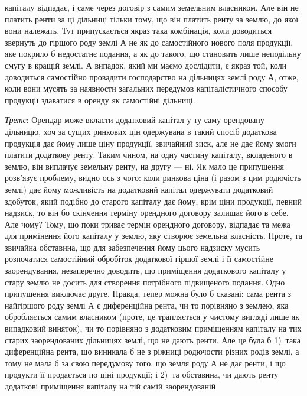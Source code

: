 \parcont{}  %
капіталу відпадає, і саме через договір з самим земельним власником. Але він не платить
ренти за ці дільниці тільки тому, що він платить ренту за землю, до
якої вони належать. Тут припускається якраз така комбінація, коли доводиться
звернуть до гіршого роду землі $А$ не як до самостійного нового поля продукції,
яке покрило б недостатнє подання, а як до такого, що становить лише
неподільну смугу в кращій землі. А випадок, який ми маємо дослідити, є якраз той,
коли доводиться самостійно провадити господарство на дільницях землі роду $А$,
отже, коли вони мусять за наявности загальних передумов капіталістичного способу
продукції здаватися в оренду як самостійні дільниці.

\emph{Третє}: Орендар може вкласти додатковий капітал у ту саму орендовану
дільницю, хоч за сущих ринкових цін одержувана в такий спосіб додаткова
продукція дає йому лише ціну продукції, звичайний зиск, але не дає йому
змоги платити додаткову ренту. Таким чином, на одну частину капіталу, вкладеного
в землю, він виплачує земельну ренту, на другу — ні. Як мало це припущення
розв’язує проблему, видно ось з чого: коли ринкова ціна (і разом
з цим родючість землі) дає йому можливість на додатковий капітал одержувати
додатковий здобуток, який подібно до старого капіталу дає йому, крім ціни продукції,
певний надзиск, то він бо скінчення терміну орендного договору залишає
його в себе. Але чому? Тому, що поки триває термін орендного договору, відпадає
та межа для примінення його капіталу у землю, яку створює земельна
власність. Проте, та звичайна обставина, що для забезпечення йому цього надзиску
мусить розпочатися самостійний обробіток додаткової гіршої землі і її самостійне
заорендування, незаперечно доводить, що приміщення додаткового капіталу
у стару землю не досить для створення потрібного підвищеного подання.
Одно припущення виключає друге. Правда, тепер можна було б сказані: сама
рента з найгіршого роду землі $А$ є диференційна рента, чи то порівняно з землею,
яка обробляється самим власником (проте, це трапляється у чистому вигляді
лише як випадковий виняток), чи то порівняно з додатковим приміщенням
капіталу на тих старих заорендованих дільницях землі, що не дають ренти.
Але це була б 1)~така диференційна рента, що виникала б не з ріжниці родючости
різних родів землі, а тому не мала б за свою передумову того, що земля
роду $А$ не дає ренти, і що продукти її продається по ціні продукції; і 2)~та обставина,
чи дають ренту додаткові приміщення капіталу на тій самій заорендованій
